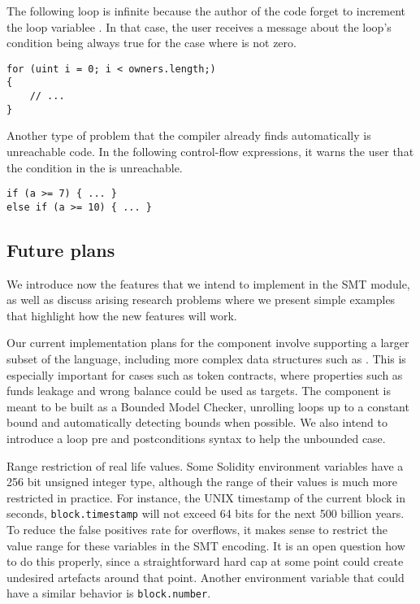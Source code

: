 The following loop is infinite because the author of the code
forget to increment the loop variablee .
%
In that case, the user receives a message about the loop's condition being
always true for the case where  is not zero.

\begin{verbatim}
for (uint i = 0; i < owners.length;)
{
    // ...
}
\end{verbatim}

Another type of problem that the compiler already finds automatically is
unreachable code.
%
In the following control-flow expressions, it warns the user that the condition
in the  is unreachable.

\begin{verbatim}
if (a >= 7) { ... }
else if (a >= 10) { ... }
\end{verbatim}


\subsection{Future plans}

We introduce now the features that we intend to implement in the SMT module, as
well as discuss arising research problems where we present simple examples that
highlight how the new features will work.

Our current implementation plans for the component involve supporting
a larger subset of the language, including more complex data structures
such as .
%
This is especially important for cases such as token contracts, where
properties such as funds leakage and wrong balance could be used as targets.
%
The component is meant to be built as a Bounded Model Checker, unrolling loops
up to a constant bound and automatically detecting bounds when possible.
%
We also intend to introduce a loop pre and postconditions syntax to help the
unbounded case.

\begin{paragraph}{Range restriction of real life values.}
Some Solidity environment variables have a 256 bit unsigned integer type,
although the range of their values is much more restricted in practice.
For instance, the UNIX timestamp of the current block in seconds,
\texttt{block.timestamp} will not exceed 64 bits for the next
500 billion years. To reduce the false positives rate for
overflows, it makes sense to restrict the value range for these
variables in the SMT encoding. It is an open question how to do
this properly, since a straightforward hard cap at some point
could create undesired artefacts around that point.
%
Another environment variable that could have a similar
behavior is \texttt{block.number}.
\end{paragraph}

